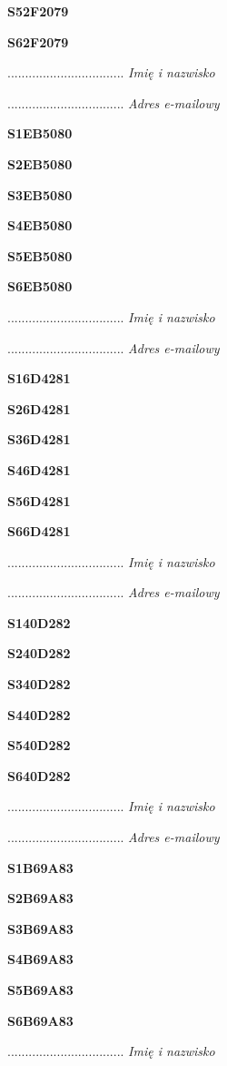 \Large \textbf{S52F2079}

\Large \textbf{S62F2079}

.................................
\textit{Imię i nazwisko}

.................................
\textit{Adres e-mailowy}

\Large \textbf{S1EB5080}

\Large \textbf{S2EB5080}

\Large \textbf{S3EB5080}

\Large \textbf{S4EB5080}

\Large \textbf{S5EB5080}

\Large \textbf{S6EB5080}

.................................
\textit{Imię i nazwisko}

.................................
\textit{Adres e-mailowy}

\Large \textbf{S16D4281}

\Large \textbf{S26D4281}

\Large \textbf{S36D4281}

\Large \textbf{S46D4281}

\Large \textbf{S56D4281}

\Large \textbf{S66D4281}

.................................
\textit{Imię i nazwisko}

.................................
\textit{Adres e-mailowy}

\Large \textbf{S140D282}

\Large \textbf{S240D282}

\Large \textbf{S340D282}

\Large \textbf{S440D282}

\Large \textbf{S540D282}

\Large \textbf{S640D282}

.................................
\textit{Imię i nazwisko}

.................................
\textit{Adres e-mailowy}

\Large \textbf{S1B69A83}

\Large \textbf{S2B69A83}

\Large \textbf{S3B69A83}

\Large \textbf{S4B69A83}

\Large \textbf{S5B69A83}

\Large \textbf{S6B69A83}

.................................
\textit{Imię i nazwisko}

